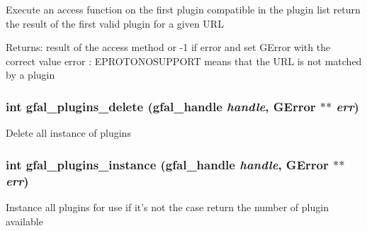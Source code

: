 Execute an access function on the first plugin compatible in the plugin list return the result of the first valid plugin for a given URL \begin{Desc}
\item[Returns:]result of the access method or -1 if error and set GError with the correct value error : EPROTONOSUPPORT means that the URL is not matched by a plugin \end{Desc}
\subsubsection{\setlength{\rightskip}{0pt plus 5cm}int gfal\_\-plugins\_\-delete (gfal\_\-handle {\em handle}, GError $\ast$$\ast$ {\em err})}\label{gfal__common__plugin_8c_3a5fd910584fad43a1a67c0e844ce528}


Delete all instance of plugins 
\subsubsection{\setlength{\rightskip}{0pt plus 5cm}int gfal\_\-plugins\_\-instance (gfal\_\-handle {\em handle}, GError $\ast$$\ast$ {\em err})\hspace{0.3cm}{\tt  [inline]}}\label{gfal__common__plugin_8c_4d38083d4b9f51095013c0f3d233c0da}


Instance all plugins for use if it's not the case return the number of plugin available 